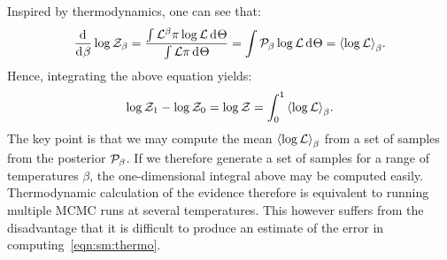 Inspired by thermodynamics, one can see that:
\begin{equation}
  \frac{\operatorname{d}^{}\!{}}{\operatorname{d}^{}\!{\beta}}\log\mathcal{Z}_\beta = \frac{\int  \mathcal{L}^\beta \pi \log\mathcal{L}\operatorname{d}^{}\!{\Theta}}{\int\mathcal{L}\pi \operatorname{d}^{}\!{\Theta}} = \int \mathcal{P}_\beta \log\mathcal{L}\operatorname{d}^{}\!{\Theta} =  {\left\langle{\log\mathcal{L}}\right\rangle}_\beta.
  \label{eqn:bay:thermo}
\end{equation}
Hence, integrating the above equation yields:
\begin{equation}
  \log\mathcal{Z}_1-\log\mathcal{Z}_0 = \log\mathcal{Z} = \int_{0}^{1}{\left\langle{\log\mathcal{L}}\right\rangle}_\beta.
  \label{eqn:sm:thermo}
\end{equation}
The key point is that we may compute the mean \({\left\langle{\log\mathcal{L}}\right\rangle}_\beta\) from a set of samples from the posterior \(\mathcal{P}_\beta\). If we therefore generate a set of samples for a range of temperatures \(\beta\), the one-dimensional integral above may be computed easily. Thermodynamic calculation of the evidence therefore is equivalent to running multiple MCMC runs at several temperatures.
This however suffers from the disadvantage that it is difficult to produce an estimate of the error in computing~\eqref{eqn:sm:thermo}. 

